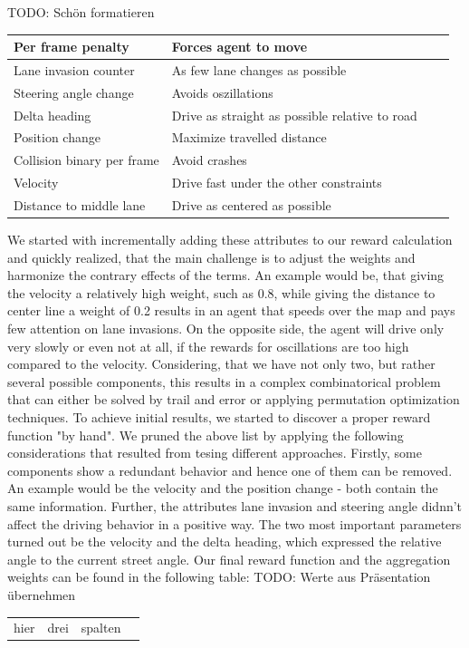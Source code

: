 \documentclass[letterpaper, 10 pt, conference]{ieeeconf}  %
\begin{document}
   



TODO: Schön formatieren
\begin{tabular}{ | l | l | l | p{5cm} |}
\hline

\hline

\hline
Per frame penalty & Forces agent to move \\
\hline
Lane invasion counter & As few lane changes as possible \\
\hline
Steering angle change & Avoids oszillations \\
\hline
Delta heading  & Drive as straight as possible relative to road \\
\hline
Position change & Maximize travelled distance \\
\hline
Collision binary per frame & Avoid crashes  \\
\hline
Velocity & Drive fast under the other constraints\\
\hline
Distance to middle lane & Drive as centered as possible\\
\hline
\end{tabular}
\newline

We started with incrementally adding these attributes to our reward calculation and quickly realized, that the main challenge is to adjust the weights and harmonize the contrary effects of the terms.
An example would be, that giving the velocity a relatively high weight, such as 0.8, while giving the distance to center line a weight of 0.2 results in an agent that speeds over the map and pays few attention on lane invasions. On the opposite side, the agent will drive only very slowly or even not at all, if the rewards for oscillations are too high compared to the velocity. Considering, that we have not only two, but rather several possible components, this results in a complex combinatorical problem that can either be solved by trail and error or applying permutation optimization techniques. To achieve initial results, we started to discover a proper reward function "by hand". 
\newline
We pruned the above list by applying the following considerations that resulted from tesing different approaches. Firstly, some components show a redundant behavior and hence one of them can be removed. An example would be the velocity and the position change - both contain the same information. Further, the attributes lane invasion and steering angle didnn't affect the driving behavior in a positive way. The two most important parameters turned out be the velocity and the delta heading, which expressed the relative angle to the current street angle. Our final reward function and the aggregation weights can be found in the following table:
\newline
TODO: Werte aus Präsentation übernehmen
\begin{tabular}{ | l | l | l | p{5cm} |}
	\hline
	hier & drei & spalten
\end{tabular}
\newline
\end{document}
